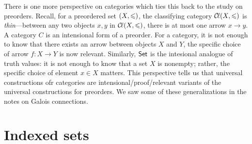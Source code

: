 \documentclass{../thesis-note}
\begin{document}
There is one more perspective on categories which ties this back to the study on
preorders. Recall, for a preordered set \({\left(X,\leqslant\right)}\), the classifying
category \({\mathcal{C}\kern-.15em\ell}{\left(X,\leqslant\right)}\) is \emph{thin}---between any two objects \(x,y\)
in \({\mathcal{C}\kern-.15em\ell}{\left(X,\leqslant\right)}\), there is at most one arrow \(x \to y\). A category
\(C\) is an intensional form of a preorder. For a category, it is not enough to
know that there exists an arrow between objects \(X\) and \(Y\), the specific
choice of arrow \(f: X \to Y\) is now relevant. Similarly, \({\mathsf{Set}}\) is the
intesional analogue of truth values: it is not enough to know that a set \(X\)
is nonempty; rather, the specific choice of element \(x \in X\) matters. This
perspective tells us that universal constructions ofr categories are
intensional/proof\-/relevant variants of the universal constructions for
preorders. We saw some of these generalizations in the notes on Galois
connections.

\section{Indexed sets}
\end{document}
